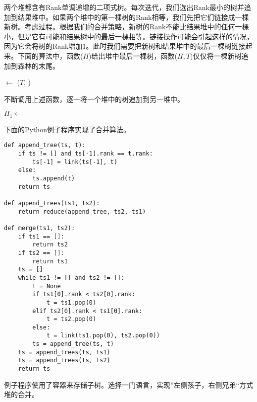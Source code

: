 \documentclass[UTF8]{article}
\begin{document}
两个堆都含有Rank单调递增的二项式树。每次迭代，我们选出Rank最小的树并追加到结果堆中。如果两个堆中的第一棵树的Rank相等，我们先把它们链接成一棵新树。考虑过程。根据我们的合并策略，新树的Rank不能比结果堆中的任何一棵小，但是它有可能和结果树中的最后一棵相等。链接操作可能会引起这样的情况，因为它会将树的Rank增加1。此时我们需要把新树和结果堆中的最后一棵树链接起来。下面的算法中，函数($H$)给出堆中最后一棵树，函数($H, T$)仅仅将一棵新树追加到森林的末尾。

\begin{algorithmic}[1]
    \State {} $\gets$ ($T$, )
  \Else
    \State {}
  \EndIf
\EndFunction
\end{algorithmic}

不断调用上述函数，逐一将一个堆中的树追加到另一堆中。

\begin{algorithmic}[1]
    \State $H_1 \gets $ 
  \EndFor
\EndFunction
\end{algorithmic}

下面的Python例子程序实现了合并算法。

\lstset{language=Python}
\begin{lstlisting}
def append_tree(ts, t):
    if ts != [] and ts[-1].rank == t.rank:
        ts[-1] = link(ts[-1], t)
    else:
        ts.append(t)
    return ts

def append_trees(ts1, ts2):
    return reduce(append_tree, ts2, ts1)

def merge(ts1, ts2):
    if ts1 == []:
        return ts2
    if ts2 == []:
        return ts1
    ts = []
    while ts1 != [] and ts2 != []:
        t = None
        if ts1[0].rank < ts2[0].rank:
            t = ts1.pop(0)
        elif ts2[0].rank < ts1[0].rank:
            t = ts2.pop(0)
        else:
            t = link(ts1.pop(0), ts2.pop(0))
        ts = append_tree(ts, t)
    ts = append_trees(ts, ts1)
    ts = append_trees(ts, ts2)
    return ts
\end{lstlisting}

\begin{Exercise}

例子程序使用了容器来存储子树。选择一门语言，实现”左侧孩子，右侧兄弟“方式堆的合并。

\end{Exercise}
\end{document}
